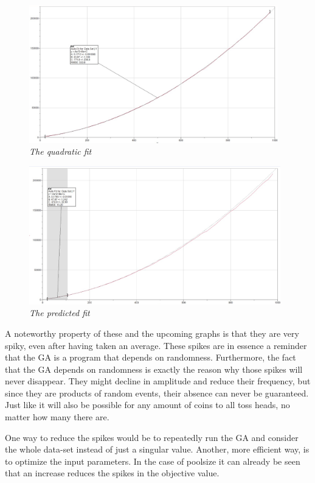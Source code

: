 \begin{figure}[H] 
\centering
\includegraphics[height=6cm]{LPPC}
\caption{\textsl{The quadratic fit}}
\label{LPPC}
\end{figure}

\begin{figure}[H] 
\centering
\includegraphics[height=6cm]{LPPP}
\caption{\textsl{The predicted fit}}
\label{LPPP}
\end{figure}

\par
A noteworthy property of these and the upcoming graphs is that they are very spiky, even after having taken an average. These spikes are in essence a reminder that the GA is a program that depends on randomness. Furthermore, the fact that the GA depends on randomness is exactly the reason why those spikes will never disappear. They might decline in amplitude and reduce their frequency, but since they are products of random events, their absence can never be guaranteed. Just like it will also be possible for any amount of coins to all toss heads, no matter how many there are.
\par
One way to reduce the spikes would be to repeatedly run the GA and consider the whole data-set instead of just a singular value. Another, more efficient way, is to optimize the input parameters. In the case of poolsize it can already be seen that an increase reduces the spikes in the objective value.

